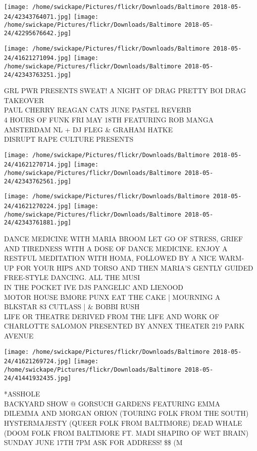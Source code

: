 \documentclass[10pt,letterpaper]{article}
\begin{document}
\texttt{[image: /home/swickape/Pictures/flickr/Downloads/Baltimore 2018-05-24/42343764071.jpg]}
\texttt{[image: /home/swickape/Pictures/flickr/Downloads/Baltimore 2018-05-24/42295676642.jpg]}

\texttt{[image: /home/swickape/Pictures/flickr/Downloads/Baltimore 2018-05-24/41621271094.jpg]}
\texttt{[image: /home/swickape/Pictures/flickr/Downloads/Baltimore 2018-05-24/42343763251.jpg]}

GRL PWR PRESENTS SWEAT!  A NIGHT OF DRAG PRETTY BOI DRAG TAKEOVER\\
PAUL CHERRY REAGAN CATS JUNE PASTEL REVERB\\
4 HOURS OF FUNK FRI MAY 18TH FEATURING ROB MANGA AMSTERDAM NL + DJ FLEG \& GRAHAM HATKE\\
DISRUPT RAPE CULTURE PRESENTS\\
\pagebreak

\texttt{[image: /home/swickape/Pictures/flickr/Downloads/Baltimore 2018-05-24/41621270714.jpg]}
\texttt{[image: /home/swickape/Pictures/flickr/Downloads/Baltimore 2018-05-24/42343762561.jpg]}

\texttt{[image: /home/swickape/Pictures/flickr/Downloads/Baltimore 2018-05-24/41621270224.jpg]}
\texttt{[image: /home/swickape/Pictures/flickr/Downloads/Baltimore 2018-05-24/42343761881.jpg]}

DANCE MEDICINE WITH MARIA BROOM LET GO OF STRESS, GRIEF AND TIREDNESS WITH A DOSE OF DANCE MEDICINE.  ENJOY A RESTFUL MEDITATION WITH HOMA, FOLLOWED BY A NICE WARM{-}UP FOR YOUR HIPS AND TORSO AND THEN MARIA'S GENTLY GUIDED FREE{-}STYLE DANCING.  ALL THE MUSI\\
IN THE POCKET IVE DJS PANGELIC AND LIENOOD\\
MOTOR HOUSE BMORE PUNX EAT THE CAKE | MOURNING A BLKSTAR 83 CUTLASS |  \& BOBBI RUSH\\
LIFE OR THEATRE DERIVED FROM THE LIFE AND WORK OF CHARLOTTE SALOMON PRESENTED BY ANNEX THEATER 219 PARK AVENUE\\
\pagebreak

\texttt{[image: /home/swickape/Pictures/flickr/Downloads/Baltimore 2018-05-24/41621269724.jpg]}
\texttt{[image: /home/swickape/Pictures/flickr/Downloads/Baltimore 2018-05-24/41441932435.jpg]}

*ASSHOLE\\
BACKYARD SHOW @ GORSUCH GARDENS FEATURING EMMA DILEMMA AND MORGAN ORION (TOURING FOLK FROM THE SOUTH) HYSTERMAJESTY (QUEER FOLK FROM BALTIMORE) DEAD WHALE (DOOM FOLK FROM BALTIMORE FT. MADI SHAPIRO OF WET BRAIN) SUNDAY JUNE 17TH 7PM ASK FOR ADDRESS! \$\$ (M\\
\pagebreak
\end{document}
